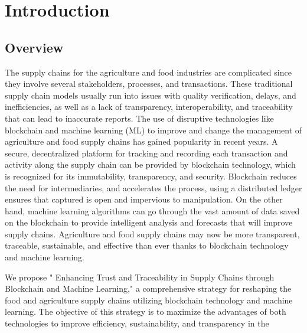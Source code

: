 
\chapter{Introduction}\doublespacing %

\label{Chapter1} %



\section{Overview}
\noindent
The supply chains for the agriculture and food industries are complicated since they involve several stakeholders, processes, and 
transactions. These traditional supply chain models usually run into issues with quality verification, delays, and inefficiencies, as 
well as a lack of transparency, interoperability, and traceability that can lead to inaccurate reports. The use of disruptive technologies 
like blockchain and machine learning (ML) to improve and change the management of agriculture and food supply chains has 
gained popularity in recent years. A secure, decentralized platform for tracking and recording each transaction and activity along 
the supply chain can be provided by blockchain technology, which is recognized for its immutability, transparency, and security. 
Blockchain reduces the need for intermediaries, and accelerates the process, using a distributed ledger ensures that captured is open 
and impervious to manipulation. On the other hand, machine learning algorithms can go through the vast amount of data saved on 
the blockchain to provide intelligent analysis and forecasts that will improve supply chains. Agriculture and food supply chains 
may now be more transparent, traceable, sustainable, and effective than ever thanks to blockchain technology and machine learning. 
\par We propose " Enhancing Trust and Traceability in Supply Chains through Blockchain and Machine Learning," a comprehensive 
strategy for reshaping the food and agriculture supply chains utilizing blockchain technology and machine learning. The objective 
of this strategy is to maximize the advantages of both technologies to improve efficiency, sustainability, and transparency in the 
